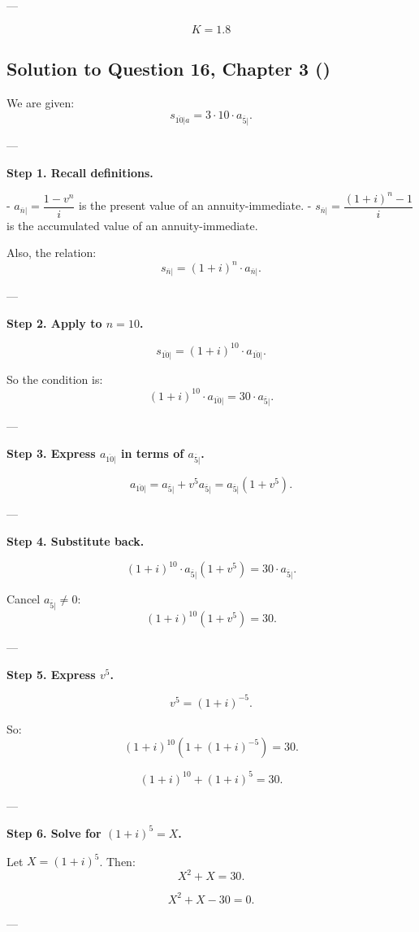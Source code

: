 \documentclass[12pt, a4paper]{article}
\begin{document}
---

\[
\boxed{K = 1.8}
\]

\subsection*{Solution to Question 16, Chapter 3 (\cite{toi3rd})}

We are given:
\[
s_{\overline{10}|a} = 3 \cdot 10 \cdot a_{\overline{5}|}.
\]

---

\textbf{Step 1. Recall definitions.}

- $a_{\overline{n}|} = \dfrac{1-v^n}{i}$ is the present value of an annuity-immediate.  
- $s_{\overline{n}|} = \dfrac{(1+i)^n - 1}{i}$ is the accumulated value of an annuity-immediate.  

Also, the relation:
\[
s_{\overline{n}|} = (1+i)^n \cdot a_{\overline{n}|}.
\]

---

\textbf{Step 2. Apply to $n=10$.}

\[
s_{\overline{10}|} = (1+i)^{10} \cdot a_{\overline{10}|}.
\]

So the condition is:
\[
(1+i)^{10} \cdot a_{\overline{10}|} = 30 \cdot a_{\overline{5}|}.
\]

---

\textbf{Step 3. Express $a_{\overline{10}|}$ in terms of $a_{\overline{5}|}$.}

\[
a_{\overline{10}|} = a_{\overline{5}|} + v^5 a_{\overline{5}|} 
= a_{\overline{5}|}(1+v^5).
\]

---

\textbf{Step 4. Substitute back.}

\[
(1+i)^{10} \cdot a_{\overline{5}|}(1+v^5) = 30 \cdot a_{\overline{5}|}.
\]

Cancel $a_{\overline{5}|} \neq 0$:
\[
(1+i)^{10}(1+v^5) = 30.
\]

---

\textbf{Step 5. Express $v^5$.}

\[
v^5 = (1+i)^{-5}.
\]

So:
\[
(1+i)^{10}\left(1+(1+i)^{-5}\right) = 30.
\]

\[
(1+i)^{10} + (1+i)^5 = 30.
\]

---

\textbf{Step 6. Solve for $(1+i)^5 = X$.}

Let $X=(1+i)^5$. Then:
\[
X^2 + X = 30.
\]

\[
X^2+X-30=0.
\]

---
\end{document}
